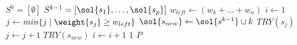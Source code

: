 \begin{algorithmic}[1]
    \State $S^0 = [\emptyset ]$
      \State $S^{k-1} = [\sol{s_1}, \ldots, \sol{s_p}]$
      \State $w_{left} \gets (w_{k} + \ldots + w_n)$
      \State $i \gets 1$
      \State $j \gets min\{j \;| \; \weight{s_j} \geq w_{left}\}$
        \State $\sol{s_{new}} \gets \sol{s^{k-1}} \cup {k} $
          \State $TRY(s_j)$
          \State $j \gets j+1$
        \EndWhile
        \State $TRY(s_{new})$
        \State $i \gets i+1$
      \EndWhile
      \State $1$
    \EndFor
  \State \Return $P$
  \EndFunction
\end{algorithmic}
